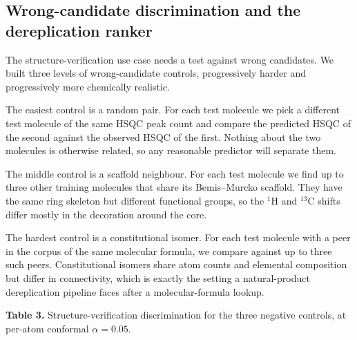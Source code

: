 \documentclass[
  11pt,
  a4paper,
]{article}
\begin{document}
\subsection*{Wrong-candidate discrimination and the dereplication ranker}

The structure-verification use case needs a test against wrong
candidates. We built three levels of wrong-candidate controls,
progressively harder and progressively more chemically realistic.

The easiest control is a random pair. For each test molecule we pick a
different test molecule of the same HSQC peak count and compare the
predicted HSQC of the second against the observed HSQC of the first.
Nothing about the two molecules is otherwise related, so any
reasonable predictor will separate them.

The middle control is a scaffold neighbour. For each test molecule we
find up to three other training molecules that share its Bemis--Murcko
scaffold. They have the same ring skeleton but different functional
groups, so the \(^{1}\)H and \(^{13}\)C shifts differ mostly in the
decoration around the core.

The hardest control is a constitutional isomer. For each test molecule
with a peer in the corpus of the same molecular formula, we compare
against up to three such peers. Constitutional isomers share atom
counts and elemental composition but differ in connectivity, which is
exactly the setting a natural-product dereplication pipeline faces
after a molecular-formula lookup.

\textbf{Table 3.} Structure-verification discrimination for the three negative
controls, at per-atom conformal \(\alpha = 0.05\).
\end{document}
